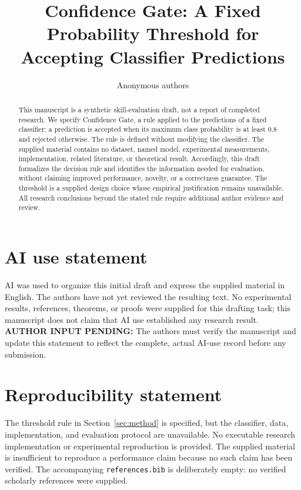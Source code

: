 \documentclass{article}
\title{Confidence Gate: A Fixed Probability Threshold for Accepting Classifier Predictions}
\author{Anonymous authors}
\newcommand{\AuthorPending}[1]{\textbf{AUTHOR INPUT PENDING:} #1}
\begin{document}
\maketitle
\begin{abstract}
This manuscript is a synthetic skill-evaluation draft, not a report of completed research.
We specify Confidence Gate, a rule applied to the predictions of a fixed classifier:
a prediction is accepted when its maximum class probability is at least $0.8$ and
rejected otherwise. The rule is defined without modifying the classifier.
The supplied material contains no dataset, named model, experimental measurements,
implementation, related literature, or theoretical result. Accordingly, this draft
formalizes the decision rule and identifies the information needed for evaluation,
without claiming improved performance, novelty, or a correctness guarantee.
The threshold is a supplied design choice whose empirical justification remains
unavailable. All research conclusions beyond the stated rule require additional
author evidence and review.
\end{abstract}

\section*{AI use statement}
AI was used to organize this initial draft and express the supplied material in
English. The authors have not yet reviewed the resulting text. No experimental
results, references, theorems, or proofs were supplied for this drafting task;
this manuscript does not claim that AI use established any research result.
\AuthorPending{The authors must verify the manuscript and update this statement
to reflect the complete, actual AI-use record before any submission.}
\section*{Reproducibility statement}
The threshold rule in Section~\ref{sec:method} is specified, but the classifier,
data, implementation, and evaluation protocol are unavailable. No executable
research implementation or experimental reproduction is provided. The supplied
material is insufficient to reproduce a performance claim because no such claim
has been verified. The accompanying \texttt{references.bib} is deliberately empty:
no verified scholarly references were supplied.
\end{document}
